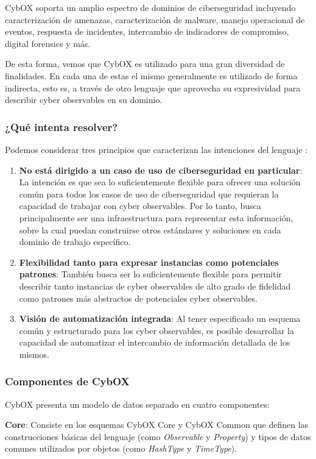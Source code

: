 CybOX soporta un amplio espectro de dominios de ciberseguridad incluyendo caracterización de amenazas, caracterización de malware, manejo operacional de eventos, respuesta de incidentes, intercambio de indicadores de compromiso, digital forensics y más.

De esta forma, vemos que CybOX es utilizado para una gran diversidad de finalidades. En cada una de estas el mismo generalmente es utilizado de forma indirecta, esto es, a través de otro lenguaje que aprovecha su expresividad para describir cyber observables en su dominio.

\subsubsection{¿Qué intenta resolver?}
Podemos considerar tres principios que caracterizan las intenciones del lenguaje \cite{observableExp}:

\begin{enumerate}
\item \textbf{No está dirigido a un caso de uso de ciberseguridad en particular}: La intención es que sea lo suficientemente flexible para ofrecer una solución común para todos los casos de uso de ciberseguridad que requieran la capacidad de trabajar con cyber observables. Por lo tanto, busca principalmente ser una infraestructura para representar esta información, sobre la cual puedan construirse otros estándares y soluciones en cada dominio de trabajo específico.
\item \textbf{Flexibilidad tanto para expresar instancias como potenciales patrones}: También busca ser lo suficientemente flexible para permitir describir tanto instancias de cyber observables de alto grado de fidelidad como patrones más abstractos de potenciales cyber observables.
\item \textbf{Visión de automatización integrada}: Al tener especificado un esquema común y estructurado para los cyber observables, es posible desarrollar la capacidad de automatizar el intercambio de información detallada de los mismos.
\end{enumerate}

\subsubsection{Componentes de CybOX}
CybOX presenta un modelo de datos separado en cuatro componentes:

\textbf{Core}: Consiste en los esquemas CybOX Core y CybOX Common que definen las construcciones básicas del lenguaje (como \emph{Observable} y \emph{Property}) y tipos de datos comunes utilizados por objetos (como \emph{HashType} y \emph{TimeType}).

